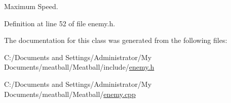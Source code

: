 Maximum Speed. 



Definition at line 52 of file enemy.\-h.



The documentation for this class was generated from the following files\-:\begin{DoxyCompactItemize}
\item 
C\-:/\-Documents and Settings/\-Administrator/\-My Documents/meatball/\-Meatball/include/\hyperlink{enemy_8h}{enemy.\-h}\item 
C\-:/\-Documents and Settings/\-Administrator/\-My Documents/meatball/\-Meatball/\hyperlink{enemy_8cpp}{enemy.\-cpp}\end{DoxyCompactItemize}
